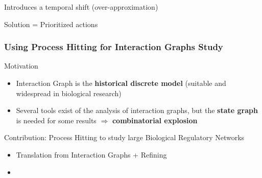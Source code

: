 \begin{frame}
\begin{center}
{
}
\end{center}

\pause[8]
\begin{fleches}
\item Introduces a temporal shift (over-approximation)
\pause[9]
\item Solution = Prioritized actions
\end{fleches}

\end{frame}


\begin{frame}
  \frametitle{Using Process Hitting for Interaction Graphs Study}

\begin{block}{Motivation}
\begin{itemize}
  \item Interaction Graph is the \textbf{historical discrete model} (suitable and widespread in biological research) 
  \item Several tools exist of the analysis of interaction graphs, but the \textbf{state graph} is needed for some results $\Rightarrow$ \textbf{combinatorial explosion}
\end{itemize}  
\end{block}

\begin{block}{Contribution: Process Hitting to study large Biological Regulatory Networks}
\begin{itemize}
  \item Translation from Interaction Graphs + Refining
  \item {}
\end{itemize}
\end{block}

\end{frame}



